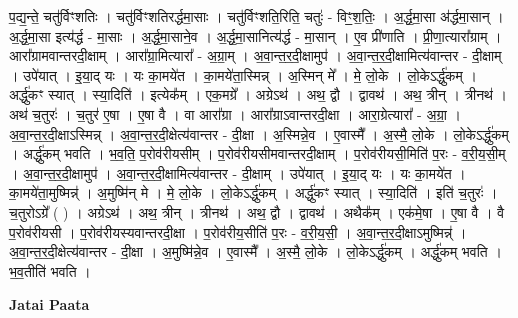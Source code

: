 \documentclass[17pt]{extarticle}
\begin{document}
प॒द्य॒न्ते॒ चतु॑र्विꣳशतिः । चतु॑र्विꣳशतिरर्द्धमा॒साः । चतु॑र्विꣳशति॒रिति॒ चतुः॑ - विꣳ॒॒श॒तिः॒ । अ॒र्द्ध॒मा॒सा अ॑र्द्धमा॒सान् । अ॒र्द्ध॒मा॒सा इत्य॑र्द्ध - मा॒साः । अ॒र्द्ध॒मा॒साने॒व । अ॒र्द्ध॒मा॒सानित्य॑र्द्ध - मा॒सान् । ए॒व प्री॑णाति । प्री॒णा॒त्यारा᳚ग्राम् । आरा᳚ग्रामवान्तरदी॒क्षाम् । आरा᳚ग्रा॒मित्यारा᳚ - अ॒ग्रा॒म् । अ॒वा॒न्त॒र॒दी॒क्षामुप॑ । अ॒वा॒न्त॒र॒दी॒क्षामित्य॑वान्तर - दी॒क्षाम् । उपे॑यात् । इ॒या॒द् यः । यः का॒मये॑त । का॒मये॑ता॒स्मिन्न् । अ॒स्मिन् मे᳚ । मे॒ लो॒के । लो॒केऽर्द्धु॑कम् । अर्द्धु॑कꣳ स्यात् । स्या॒दिति॑ । इत्येक᳚म् । एक॒मग्रे᳚ । अग्रेऽथ॑ । अथ॒ द्वौ । द्वावथ॑ । अथ॒ त्रीन् । त्रीनथ॑ । अथ॑ च॒तुरः॑ । च॒तुर॑ ए॒षा । ए॒षा वै । वा आरा᳚ग्रा । आरा᳚ग्राऽवान्तरदी॒क्षा । आरा॒ग्रेत्यारा᳚ - अ॒ग्रा॒ । अ॒वा॒न्त॒र॒दी॒क्षाऽस्मिन्न् । अ॒वा॒न्त॒र॒दी॒क्षेत्य॑वान्तर - दी॒क्षा । अ॒स्मिन्ने॒व । ए॒वास्मै᳚ । अ॒स्मै॒ लो॒के । लो॒केऽर्द्धु॑कम् । अर्द्धु॑कम् भवति । भ॒व॒ति॒ प॒रोव॑रीयसीम् । प॒रोव॑रीयसीमवान्तरदी॒क्षाम् । प॒रोव॑रीयसी॒मिति॑ प॒रः - व॒री॒य॒सी॒म् । अ॒वा॒न्त॒र॒दी॒क्षामुप॑ । अ॒वा॒न्त॒र॒दी॒क्षामित्य॑वान्तर - दी॒क्षाम् । उपे॑यात् । इ॒या॒द् यः । यः का॒मये॑त । का॒मये॑ता॒मुष्मिन्न्॑ । अ॒मुष्मि॑न् मे । मे॒ लो॒के । लो॒केऽर्द्धु॑कम् । अर्द्धु॑कꣳ स्यात् । स्या॒दिति॑ । इति॑ च॒तुरः॑ । च॒तुरोऽग्रे᳚ ( ) । अग्रेऽथ॑ । अथ॒ त्रीन् । त्रीनथ॑ । अथ॒ द्वौ । द्वावथ॑ । अथैक᳚म् । एक॑मे॒षा । ए॒षा वै । वै प॒रोव॑रीयसी । प॒रोव॑रीयस्यवान्तरदी॒क्षा । प॒रोव॑रीय॒सीति॑ प॒रः - व॒री॒य॒सी॒ । अ॒वा॒न्त॒र॒दी॒क्षाऽमुष्मिन्न्॑ । अ॒वा॒न्त॒र॒दी॒क्षेत्य॑वान्तर - दी॒क्षा । अ॒मुष्मि॑न्ने॒व । ए॒वास्मै᳚ । अ॒स्मै॒ लो॒के । लो॒केऽर्द्धु॑कम् । अर्द्धु॑कम् भवति । भ॒व॒तीति॑ भवति । \newline

\textbf{Jatai Paata} \newline
\end{document}
